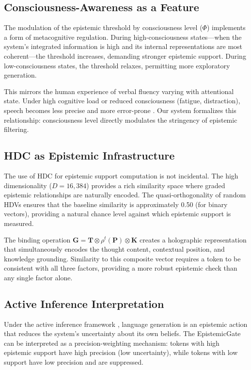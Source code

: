 \documentclass[12pt,a4paper]{article}
\begin{document}
\subsection{Consciousness-Awareness as a Feature}

The modulation of the epistemic threshold by consciousness level ($\Phi$) implements a form of metacognitive regulation. During high-consciousness states---when the system's integrated information is high and its internal representations are most coherent---the threshold increases, demanding stronger epistemic support. During low-consciousness states, the threshold relaxes, permitting more exploratory generation.

This mirrors the human experience of verbal fluency varying with attentional state. Under high cognitive load or reduced consciousness (fatigue, distraction), speech becomes less precise and more error-prone \citep{levelt1989speaking}. Our system formalizes this relationship: consciousness level directly modulates the stringency of epistemic filtering.

\subsection{HDC as Epistemic Infrastructure}

The use of HDC for epistemic support computation is not incidental. The high dimensionality ($D = 16{,}384$) provides a rich similarity space where graded epistemic relationships are naturally encoded. The quasi-orthogonality of random HDVs ensures that the baseline similarity is approximately 0.50 (for binary vectors), providing a natural chance level against which epistemic support is measured.

The binding operation $\mathbf{G} = \mathbf{T} \otimes \rho^t(\mathbf{P}) \otimes \mathbf{K}$ creates a holographic representation that simultaneously encodes the thought content, contextual position, and knowledge grounding. Similarity to this composite vector requires a token to be consistent with all three factors, providing a more robust epistemic check than any single factor alone.

\subsection{Active Inference Interpretation}

Under the active inference framework \citep{friston2010free}, language generation is an epistemic action that reduces the system's uncertainty about its own beliefs. The EpistemicGate can be interpreted as a precision-weighting mechanism: tokens with high epistemic support have high precision (low uncertainty), while tokens with low support have low precision and are suppressed.
\end{document}
